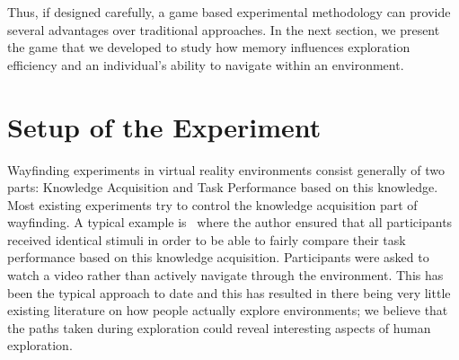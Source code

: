 Thus, if designed carefully, a game based experimental methodology can provide several advantages over traditional approaches. In the next section, we present the game that we developed to study how memory influences exploration efficiency and an individual's ability to navigate within an environment.





\section{Setup of the Experiment} %
\label{sec:experiment_performed_minecraft}


Wayfinding experiments in virtual reality environments consist generally of two parts: Knowledge Acquisition and Task Performance based on this knowledge. Most existing experiments try to control the knowledge acquisition part of wayfinding. A typical example is~\cite{meilinger2008working} where the author ensured that all participants received identical stimuli in order to be able to fairly compare their task performance based on this knowledge acquisition. Participants were asked to watch a video rather than actively navigate through the environment. This has been the typical approach to date and this has resulted in there being very little existing literature on how people actually explore environments; we believe that the paths taken during exploration could reveal interesting aspects of human exploration.

